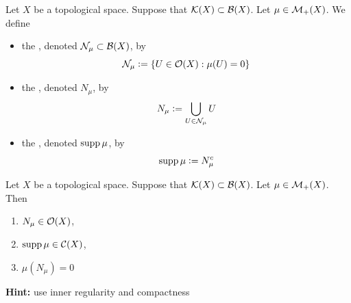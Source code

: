 \documentclass{book}
\begin{document}
	\begin{defn} 
		Let $X$ be a topological space. Suppose that $\mathcal{K}(X) \subset \mathcal{B}(X)$. Let $\mu \in \mathcal{M}_+(X)$. We define 
		\begin{itemize}
			\item the , denoted $\mathcal{N}_{\mu} \subset \mathcal{B}(X)$, by 
			$$\mathcal{N}_{\mu} \vcentcolon= \{U \in \mathcal{O}(X): \mu(U) = 0\}$$ 
			\item the , denoted $N_{\mu}$, by 
			$$N_{\mu} \vcentcolon= \bigcup_{U \in \mathcal{N}_{\mu}} U $$
			\item the , denoted $\operatorname{supp} \mu$, by 
			$$\operatorname{supp} \mu \vcentcolon= N_{\mu}^c$$ 
		\end{itemize}
	\end{defn}
	
	\begin{note}
	\end{note}

	\begin{ex}  
		Let $X$ be a topological space. Suppose that $\mathcal{K}(X) \subset \mathcal{B}(X)$. Let $\mu \in \mathcal{M}_+(X)$. Then 
		\begin{enumerate}
			\item $N_{\mu} \in \mathcal{O}(X)$,
			\item $\operatorname{supp} \mu \in \mathcal{C}(X)$,
			\item $\mu(N_{\mu}) = 0$
		\end{enumerate}
		\textbf{Hint:} use inner regularity and compactness
	\end{ex}
	
\end{document}
